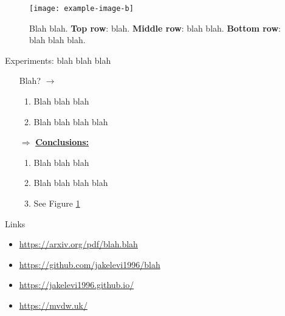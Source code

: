 \documentclass{beamer}
\begin{document}
\begin{frame}[t]
\begin{minipage}[t][.8\textheight]{0.45\textwidth}
        \vfill

        \begin{figure}
            \centering
            \texttt{[image: example-image-b]}
            \caption{Blah blah. \textbf{Top row}: blah. \textbf{Middle row}: blah blah. \textbf{Bottom row}: blah blah blah.}
            \label{fig:blah blah}
        \end{figure}

        \vfill

        \begin{block}{Experiments: blah blah blah}
            \begin{itemize}
                \item[\boxed{\;?\;}] Blah? $\rightarrow$ \\
                \begin{enumerate}
                    \normalsize
                    \item Blah blah blah
                    \item Blah blah blah blah
                \end{enumerate}
                \item[$\Rightarrow$] \textbf{\underline{Conclusions:}} \\
                \begin{enumerate}
                    \normalsize
                    \item Blah blah blah
                    \item Blah blah blah blah
                    \item See Figure \ref{fig:blah blah}
                \end{enumerate}
            \end{itemize}
        \end{block}

        \vfill


        \begin{block}{Links}
            \begin{itemize}
                \item \url{https://arxiv.org/pdf/blah.blah}
                \item \url{https://github.com/jakelevi1996/blah}
                \item \url{https://jakelevi1996.github.io/}
                \item \url{https://mvdw.uk/}
            \end{itemize}
        \end{block}

    \end{minipage}
    \hspace{1cm}

\end{frame}
\end{document}
